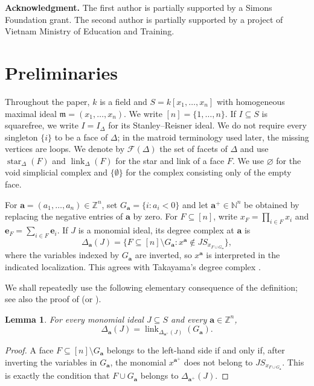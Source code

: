 \documentclass[12pt]{amsart}
\theoremstyle{plain}
\newtheorem{lemma}[theorem]{Lemma}
\theoremstyle{definition}
\theoremstyle{remark}
\begin{document}
\noindent\textbf{Acknowledgment.} The first author is partially supported by a Simons Foundation grant. The second author is partially supported by a project of Vietnam Ministry of Education and Training.

\section{Preliminaries}\label{sec:preliminaries}

Throughout the paper, $k$ is a field and $S=k[x_1,\ldots,x_n]$ with homogeneous
maximal ideal $\mathfrak m=(x_1,\ldots,x_n)$. We write $[n]=\{1,\ldots,n\}$.
If $I\subseteq S$ is squarefree, we write $I=I_\Delta$ for its
Stanley--Reisner ideal. We do not require every singleton $\{i\}$ to be a face
of $\Delta$; in the matroid terminology used later, the missing vertices are
loops. We denote by $\mathcal F(\Delta)$ the set of facets of $\Delta$ and use
$\operatorname{star}_\Delta(F)$ and $\operatorname{link}_\Delta(F)$ for the
star and link of a face $F$. We use $\varnothing$ for the void simplicial
complex and $\{\emptyset\}$ for the complex consisting only of the empty face.

For $\mathbf a=(a_1,\ldots,a_n)\in\mathbb Z^n$, set
$G_{\mathbf a}=\{i:a_i<0\}$ and let $\mathbf a^+\in\mathbb N^n$ be obtained by
replacing the negative entries of $\mathbf a$ by zero. For $F\subseteq[n]$,
write $x_F=\prod_{i\in F}x_i$ and $\mathbf e_F=\sum_{i\in F}\mathbf e_i$. If
$J$ is a monomial ideal, its degree complex at $\mathbf a$ is
$$
\Delta_{\mathbf a}(J)
=
\bigl\{F\subseteq[n]\setminus G_{\mathbf a}:
 x^{\mathbf a}\notin J S_{x_{F\cup G_{\mathbf a}}}\bigr\},
$$
where the variables indexed by $G_{\mathbf a}$ are inverted, so
$x^{\mathbf a}$ is interpreted in the indicated localization. This agrees
with Takayama's degree complex \cite{Takayama}.

We shall repeatedly use the following elementary consequence of the
definition; see also the proof of \cite[Lemma~3.1]{HaMinh} (or \cite[Theorem 1.6]{MinhTrung}).

\begin{lemma}\label{lem:negative-link}
For every monomial ideal $J\subseteq S$ and every $\mathbf a\in\mathbb Z^n$,
$$
\Delta_{\mathbf a}(J)
=
\operatorname{link}_{\Delta_{\mathbf a^+}(J)}(G_{\mathbf a}).
$$
\end{lemma}

\begin{proof}
A face $F\subseteq[n]\setminus G_{\mathbf a}$ belongs to the left-hand side
if and only if, after inverting the variables in $G_{\mathbf a}$, the monomial
$x^{\mathbf a^+}$ does not belong to $J S_{x_{F\cup G_{\mathbf a}}}$. This is
exactly the condition that $F\cup G_{\mathbf a}$ belongs to
$\Delta_{\mathbf a^+}(J)$.
\end{proof}
\end{document}
